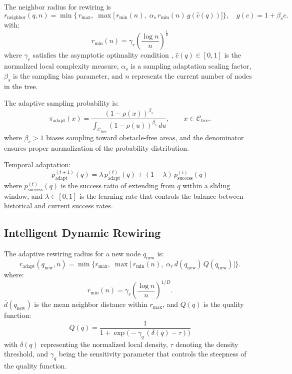 \documentclass[pdflatex,sn-mathphys-num]{sn-jnl}
\theoremstyle{thmstyleone}%
\theoremstyle{thmstyletwo}%
\theoremstyle{thmstylethree}%
\begin{document}
The neighbor radius for rewiring is
\begin{equation}
   r_{\mathrm{neighbor}}(q,n)
    = \min\!\Big\{\, r_{\max},\;
    \max\!\big[\, r_{\min}(n),\; \alpha_s\, r_{\min}(n)\, g(\widehat{c}(q)) \big] \Big\},
    \quad g(c)=1+\beta_s c.
\end{equation}
with:
\[
    r_{\min}(n) = \gamma_r \left(\frac{\log n}{n}\right)^{\!\frac{1}{d}}
\]
where $\gamma_r$ satisfies the asymptotic optimality condition \cite{8}, $\widehat{c}(q) \in [0,1]$ is the normalized local complexity measure, $\alpha_s$ is a sampling adaptation scaling factor, $\beta_s$ is the sampling bias parameter, and $n$ represents the current number of nodes in the tree.

The adaptive sampling probability is:
\begin{equation}
    \pi_{\mathrm{adapt}}(x) =
    \frac{(1-\rho(x))^{\beta_s}}
    {\displaystyle \int_{\mathcal{C}_{\mathrm{free}}} (1-\rho(u))^{\beta_s}\,du},
    \qquad x\in \mathcal{C}_{\mathrm{free}}.
\end{equation}
where $\beta_s > 1$ biases sampling toward obstacle-free areas, and the denominator ensures proper normalization of the probability distribution.

Temporal adaptation:
\begin{equation}
    p_{\mathrm{adapt}}^{(t+1)}(q) = \lambda \, p_{\mathrm{adapt}}^{(t)}(q) + (1-\lambda) \, p_{\mathrm{success}}^{(t)}(q)
\end{equation}
where $p_{\mathrm{success}}^{(t)}(q)$ is the success ratio of extending from $q$ within a sliding window, and $\lambda \in [0,1]$ is the learning rate that controls the balance between historical and current success rates.

\subsection{Intelligent Dynamic Rewiring}\label{subsec4}

The adaptive rewiring radius for a new node $q_{\mathrm{new}}$ is:
\begin{equation}
    r_{\mathrm{adapt}}(q_{\mathrm{new}}, n) =
    \min\!\Big\{ r_{\max},\;
    \max\!\big[\, r_{\min}(n),\; \alpha_r\, \overline{d}(q_{\mathrm{new}})\, Q(q_{\mathrm{new}}) \big] \Big\}.
\end{equation}
where:
\begin{equation}
    r_{\min}(n) = \gamma_r \left( \frac{\log n}{n} \right)^{\!1/D}.
\end{equation}
$\overline{d}(q_{\mathrm{new}})$ is the mean neighbor distance within $r_{\max}$, and $Q(q)$ is the quality function:
\begin{equation}
    Q(q) = \frac{1}{1 + \exp\big(-\gamma_q \, (\delta(q) - \tau)\big)}
\end{equation}
with $\delta(q)$ representing the normalized local density, $\tau$ denoting the density threshold, and $\gamma_q$ being the sensitivity parameter that controls the steepness of the quality function.
\end{document}
